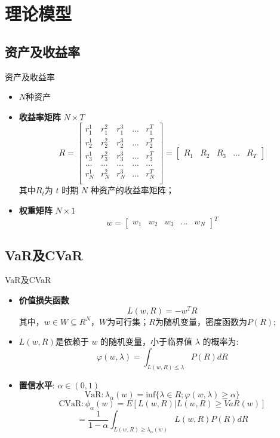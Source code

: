 \documentclass[CJK,aspectratio=43]{beamer}  %
\begin{document}
\section{理论模型}
\subsection{资产及收益率}
\begin{frame}{资产及收益率}
	\begin{itemize}
		\item $N$种资产
		\item \textbf{收益率矩阵} $N\times T$
		$$
		R=
		\begin{bmatrix}
			r_1^1 & r_1^2 & r_1^3 & ... & r_1^T\\
			r_2^1 & r_2^2 & r_2^3 & ... & r_2^T\\
			r_3^1 & r_3^2 & r_3^3 & ... & r_3^T\\
			... & ... & ... & ... & ...\\
			r_N^1 & r_N^2 & r_N^3 & ... & r_N^T\\
		\end{bmatrix}
		=
		\begin{bmatrix}
			R_1 & R_2 & R_3 &... & R_T
		\end{bmatrix}
		$$
		其中$R_t$为 $t$ 时期 $N$ 种资产的收益率矩阵；
		\item \textbf{权重矩阵} $N \times 1$
		$$
		w=\begin{bmatrix}
			w_1 & w_2 & w_3 & ... & w_N
		\end{bmatrix}^T
		$$
	\end{itemize}
	\end{frame}

\subsection{VaR及CVaR}
	\begin{frame}{VaR及CVaR}
	\begin{itemize}
		\item \textbf{价值损失函数}
		$$
		L(w,R)=-w^TR
		$$
		其中，$w\in W\subseteq R^N$，$W$为可行集；$R$为随机变量，密度函数为$P(R)$;
		\item $L(w,R)$是依赖于 $w$ 的随机变量，小于临界值 $\lambda$ 的概率为:
		$$
		\varphi(w,\lambda)=\int_{L(w,R)\leq\lambda}P(R)dR
		$$
		\item \textbf{置信水平}: $\alpha\in(0,1)$
		$$
		\text{VaR}:\lambda_{\alpha}(w)=\text{inf}\{\lambda\in R;\varphi(w,\lambda) \geq \alpha \}
		$$
		$$
		\text{CVaR}:\phi_{\alpha}(w)=E[L(w,R) \vert L(w,R) \geq VaR(w)]
		$$
		$$
		=\frac{1}{1-\alpha}\int_{L(w,R)\geq \lambda_{\alpha}(w)}L(w,R)P(R)dR
		$$
	\end{itemize}
	\end{frame}
\end{document}
